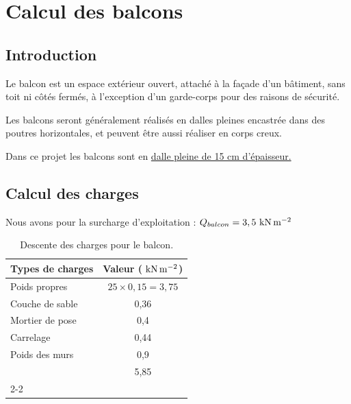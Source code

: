 	
	
	
	
	
	
	
	
	
	
	
	
	
	
	
	
	
	
	
	
	
	
	
	
	
	
	
	
	
	
	
	
	
	
	
	
	
	
	
	
	
	\section{Calcul des balcons}
	
	\subsection{Introduction}
	
	Le balcon est un espace extérieur ouvert, attaché à la façade d'un bâtiment, sans toit ni côtés fermés, à l'exception d'un garde-corps pour des raisons de sécurité.
	
	\vspace{\baselineskip}
	
	Les balcons seront généralement réalisés en dalles pleines encastrée dans des poutres
	horizontales, et peuvent être aussi réaliser en corps creux.
	
	Dans ce projet les balcons sont en \underline{dalle pleine de 15 cm d'épaisseur.}
	
	\subsection{Calcul des charges}
	
	Nous avons pour la surcharge d'exploitation : $Q_{balcon} = 3,5\knms$
	
	\vspace{\baselineskip}
	
	\begin{table}[H]
		\centering
		\caption{Descente des charges pour le balcon.}
		\label{tab:decente-charges-balcon}
		\begin{tabular}{|l|c|}
			\hline
			Types de charges & Valeur ($\knms$) \\ \hline
			Poids propres & $25 \times 0,15 = 3,75$ \\
			Couche de sable & 0,36 \\
			Mortier de pose & 0,4 \\
			Carrelage & 0,44 \\
			Poids des murs & 0,9 \\ \hline
			\multicolumn{1}{c|}{} & 5,85 \\ \cline{2-2}
			
		\end{tabular}
	\end{table}
	

